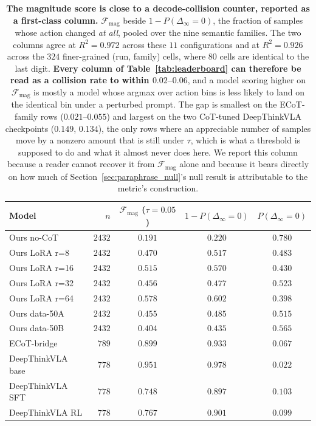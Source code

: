 \documentclass{article}
\begin{document}
\begin{table}[t]
\centering
\small
\setlength{\tabcolsep}{5pt}
\begin{tabular}{lrccc}
\toprule
Model & $n$ & $\mathcal{F}_{\text{mag}}$ ($\tau{=}0.05$) & $1 - P(\Delta_\infty{=}0)$ & $P(\Delta_\infty{=}0)$ \\
\midrule
Ours no-CoT           & $2432$ & $0.191$ & $0.220$ & $0.780$ \\
Ours LoRA r=8         & $2432$ & $0.470$ & $0.517$ & $0.483$ \\
Ours LoRA r=16        & $2432$ & $0.515$ & $0.570$ & $0.430$ \\
Ours LoRA r=32        & $2432$ & $0.456$ & $0.477$ & $0.523$ \\
Ours LoRA r=64        & $2432$ & $0.578$ & $0.602$ & $0.398$ \\
Ours data-50A         & $2432$ & $0.455$ & $0.485$ & $0.515$ \\
Ours data-50B         & $2432$ & $0.404$ & $0.435$ & $0.565$ \\
ECoT-bridge           & $789$  & $0.899$ & $0.933$ & $0.067$ \\
\midrule
DeepThinkVLA base     & $778$  & $0.951$ & $0.978$ & $0.022$ \\
DeepThinkVLA SFT      & $778$  & $0.748$ & $0.897$ & $0.103$ \\
DeepThinkVLA RL       & $778$  & $0.767$ & $0.901$ & $0.099$ \\
\bottomrule
\end{tabular}
\caption{\textbf{The magnitude score is close to a decode-collision counter, reported as a first-class column.} $\mathcal{F}_{\text{mag}}$ beside $1 - P(\Delta_\infty = 0)$, the fraction of samples whose action changed \emph{at all}, pooled over the nine semantic families. The two columns agree at $R^2 = 0.972$ across these $11$ configurations and at $R^2 = 0.926$ across the $324$ finer-grained (run, family) cells, where $80$ cells are identical to the last digit. \textbf{Every column of Table~\ref{tab:leaderboard} can therefore be read as a collision rate to within $0.02$--$0.06$}, and a model scoring higher on $\mathcal{F}_{\text{mag}}$ is mostly a model whose argmax over action bins is less likely to land on the identical bin under a perturbed prompt. The gap is smallest on the ECoT-family rows ($0.021$--$0.055$) and largest on the two CoT-tuned DeepThinkVLA checkpoints ($0.149$, $0.134$), the only rows where an appreciable number of samples move by a nonzero amount that is still under $\tau$, which is what a threshold is supposed to do and what it almost never does here. We report this column because a reader cannot recover it from $\mathcal{F}_{\text{mag}}$ alone and because it bears directly on how much of Section~\ref{sec:paraphrase_null}'s null result is attributable to the metric's construction.}
\label{tab:collision}
\end{table}
\end{document}
